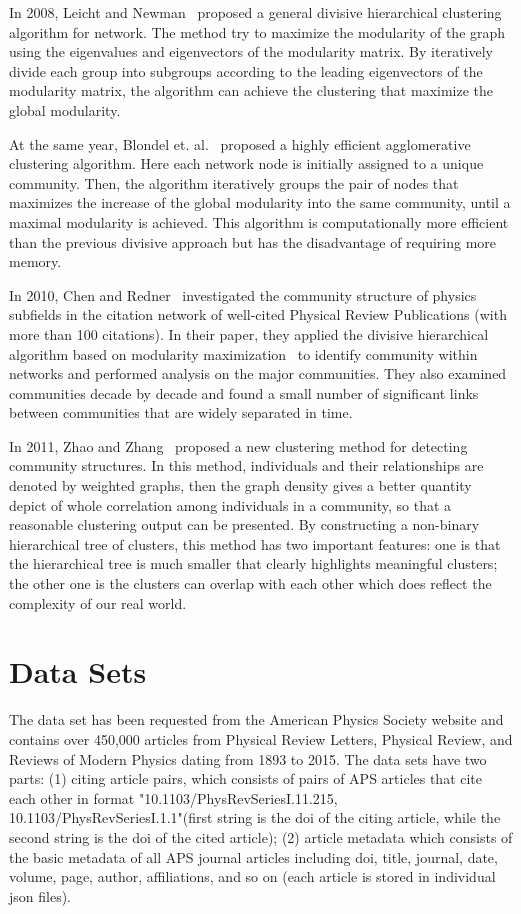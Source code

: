 \documentclass{article} %
\begin{document}
In 2008, Leicht and Newman~\cite{Newman_divisive} proposed a general divisive hierarchical clustering algorithm for network. The method try to maximize the modularity of the graph using the eigenvalues and eigenvectors of the modularity matrix. By iteratively divide each group into subgroups according to the leading eigenvectors of the modularity matrix, the algorithm can achieve the clustering that maximize the global modularity. 

At the same year, Blondel et. al.~\cite{bottom_up} proposed a highly efficient agglomerative clustering algorithm. Here each network node is initially assigned to a unique community. Then, the algorithm iteratively groups the pair of nodes that maximizes the increase of the global modularity into the same community, until a maximal modularity is achieved. This algorithm is computationally more efficient than the previous divisive approach but has the disadvantage of requiring more memory. 

In 2010, Chen and Redner~\cite{phys_rev} investigated the community structure of physics subfields in the citation network of well-cited Physical Review Publications (with more than 100 citations). In their paper, they applied the divisive hierarchical algorithm based on modularity maximization~\cite{Newman_divisive} to identify community within networks and performed analysis on the major communities. They also examined communities decade by decade and found a small number of significant links between communities that are widely separated in time. 

In 2011, Zhao and Zhang~\cite{new_method} proposed a new clustering method for detecting community structures. In this method, individuals and their relationships are denoted by weighted graphs, then the graph density gives a better quantity depict of whole correlation among individuals in a community, so that a reasonable clustering output can be presented. By constructing a non-binary hierarchical tree of clusters, this method has two important features: one is that the hierarchical tree is much smaller that clearly highlights meaningful clusters; the other one is the clusters can overlap with each other which does reflect the complexity of our real world.

\section{Data Sets}
\label{data}

The data set has been requested from the American Physics Society website and contains over 450,000 articles from Physical Review Letters, Physical Review, and Reviews of Modern Physics dating from 1893 to 2015. The data sets have two parts:
(1) citing article pairs, which consists of pairs of APS articles that cite each other in format "10.1103/PhysRevSeriesI.11.215, 10.1103/PhysRevSeriesI.1.1"(first string is the doi of the citing article, while the second string is the doi of the cited article); (2) article metadata which consists of the basic metadata of all APS journal articles including doi, title, journal, date, volume, page, author, affiliations, and so on (each article is stored in individual json files).
\end{document}
